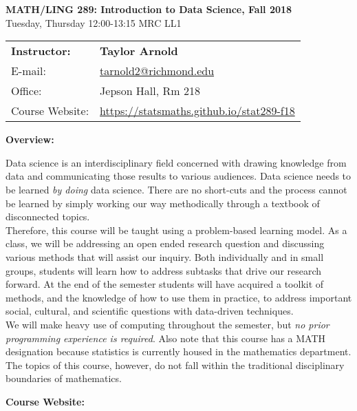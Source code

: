 \documentclass[12pt]{article}
\begin{document}
\begin{center}
{\bf MATH/LING 289: Introduction to Data Science, Fall 2018} \\
Tuesday, Thursday 12:00-13:15 \quad MRC LL1\\
\end{center}

\bigskip

\noindent
\begin{tabular}{ l l }
{\bf Instructor:} &  {\bf Taylor Arnold} \\
E-mail: & \href{mailto:tarnold2@richmond.edu}{tarnold2@richmond.edu} \\
Office: & Jepson Hall, Rm 218 \\
Course Website: & \url{https://statsmaths.github.io/stat289-f18}
\end{tabular}

\vspace{0.5cm}

\textbf{Overview:} \vspace{6pt}

Data science is an interdisciplinary field concerned with drawing knowledge
from data and communicating those results to various audiences. Data
science needs to be learned \textit{by doing} data science. There are
no short-cuts and the process cannot be learned by simply working our way
methodically through a textbook of disconnected topics.\\

Therefore, this course will be taught using a problem-based learning model. As
a class, we will be addressing an open ended research question and discussing
various methods that will assist our inquiry. Both individually and in small
groups, students will learn how to address subtasks that drive
our research forward. At the end of the semester students will have acquired
a toolkit of methods, and the knowledge of how to use them in practice, to
address important social, cultural, and scientific questions with data-driven
techniques.\\

We will make heavy use of computing throughout the semester, but \textit{no
prior programming experience is required}. Also note that this course has a
MATH designation because statistics is currently housed in the mathematics
department. The topics of this course, however, do not fall within the
traditional disciplinary boundaries of mathematics.

\bigskip

\textbf{Course Website:} \vspace{6pt}
\end{document}
